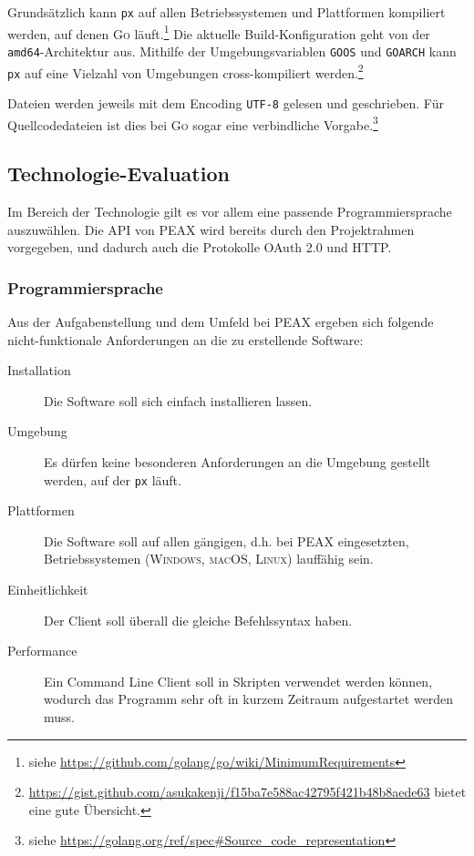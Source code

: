 Grundsätzlich kann \texttt{px} auf allen Betriebssystemen und Plattformen kompiliert werden, auf denen \textsc{Go} läuft.\footnote{siehe \url{https://github.com/golang/go/wiki/MinimumRequirements}} Die aktuelle Build-Konfiguration geht von der \texttt{amd64}-Architek\-tur aus. Mithilfe der Umgebungsvariablen \texttt{GOOS} und \texttt{GOARCH} kann \texttt{px} auf eine Vielzahl von Umgebungen cross-kompiliert werden.\footnote{\url{https://gist.github.com/asukakenji/f15ba7e588ac42795f421b48b8aede63} bietet eine gute Übersicht.}

Dateien werden jeweils mit dem Encoding \texttt{UTF-8} gelesen und geschrieben. Für Quellcodedateien ist dies bei \textsc{Go} sogar eine verbindliche Vorgabe.\footnote{siehe \url{https://golang.org/ref/spec\#Source_code_representation}}

\subsection{Technologie-Evaluation}

Im Bereich der Technologie gilt es vor allem eine passende Programmiersprache auszuwählen. Die API von PEAX wird bereits durch den Projektrahmen vorgegeben, und dadurch auch die Protokolle OAuth 2.0 und HTTP.

\subsubsection{Programmiersprache}

Aus der Aufgabenstellung und dem Umfeld bei PEAX ergeben sich folgende nicht-funktio\-nale Anforderungen an die zu erstellende Software:

\begin{description}
    \item[Installation] Die Software soll sich einfach installieren lassen.
    \item[Umgebung] Es dürfen keine besonderen Anforderungen an die Umgebung gestellt werden, auf der \texttt{px} läuft.
    \item[Plattformen] Die Software soll auf allen gängigen, d.h. bei PEAX eingesetzten, Betriebssystemen (\textsc{Windows}, \textsc{macOS}, \textsc{Linux}) lauffähig sein.
    \item[Einheitlichkeit] Der Client soll überall die gleiche Befehlssyntax haben.
    \item[Performance] Ein Command Line Client soll in Skripten verwendet werden können, wodurch das Programm sehr oft in kurzem Zeitraum aufgestartet werden muss.
\end{description}

